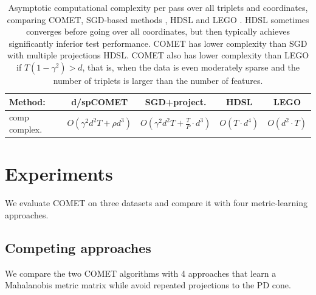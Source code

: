 \documentclass[twoside,11pt]{article}
\begin{document}
\begin{table}[t]
\captionsetup{font=small}
\caption{Asymptotic computational complexity per pass over all triplets and coordinates, comparing COMET, SGD-based methods \citep{OASIS, qian}, HDSL \citep{HDSL} and LEGO \citep{lego}. HDSL sometimes converges before going over all coordinates, but then typically achieves significantly inferior test performance. COMET has lower complexity than SGD with multiple projections HDSL. COMET also has lower complexity than LEGO if $T(1-\gamma^2) > d$, that is, when the data is even moderately sparse and the number of triplets is larger than the number of features.}
\label{comp-complx}
\vskip 0.15in
\begin{center}
\begin{small}
\begin{sc}
\begin{tabular}{lcccc}
\hline
Method: & d/spCOMET  & SGD+project.  & HDSL    & LEGO         \\ 
\hline
comp complex. & $O(\gamma^2 d^2 T +  \rho d^3)$&  $O(\gamma^2 d^2 T + \frac{T}{P} \cdot d^3)$
&   $O( T\cdot  d^4)$ &   $O(d^2 \cdot T)$  \\
\hline
\end{tabular}
\vskip -5pt
\parbox{12.5cm}{}

\end{sc}
\end{small}
\end{center}
\vskip -0.1in
\vspace{-6pt}
\end{table}



\vspace{-6pt}
\section{Experiments}\vskip -5pt
We evaluate COMET on three datasets and compare it with four metric-learning approaches. 

\vspace{-6pt}
\subsection{Competing approaches}\vskip -5pt
We compare the two COMET algorithms with 4 approaches that learn a Mahalanobis metric matrix while avoid repeated projections to the PD cone.
\end{document}
